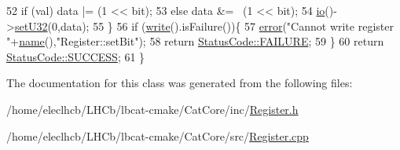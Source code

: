 \begin{DoxyCode}
52     \textcolor{keywordflow}{if} (val) data |= (1 << bit);
53     \textcolor{keywordflow}{else}     data &= ~(1 << bit);
54     \hyperlink{classIOobject_af04fb94137c3d86849f478ac5afab5d1}{io}()->\hyperlink{classIOdata_abbed9a057203bc763f97b85fb385f36b}{setU32}(0,data);
55   \}
56   \textcolor{keywordflow}{if} (\hyperlink{classIOobject_a9f6984bc9f0fadcf800f1be2523ac744}{write}().isFailure())\{
57     \hyperlink{classObject_a204a95f57818c0f811933917a30eff45}{error}(\textcolor{stringliteral}{"Cannot write register "}+\hyperlink{classObject_a300f4c05dd468c7bb8b3c968868443c1}{name}(),\textcolor{stringliteral}{"Register::setBit"});
58     \textcolor{keywordflow}{return} \hyperlink{classStatusCode_a6f565cbeadc76d14c72f047e5e85eb4ba3da73d4c469762eb9d3c960368252b26}{StatusCode::FAILURE};
59   \}
60   \textcolor{keywordflow}{return} \hyperlink{classStatusCode_a6f565cbeadc76d14c72f047e5e85eb4badd0da38d3ba0d922efd1f4619bc37ad8}{StatusCode::SUCCESS};
61 \}
\end{DoxyCode}


The documentation for this class was generated from the following files\+:\begin{DoxyCompactItemize}
\item 
/home/eleclhcb/\+L\+H\+Cb/lbcat-\/cmake/\+Cat\+Core/inc/\hyperlink{Register_8h}{Register.\+h}\item 
/home/eleclhcb/\+L\+H\+Cb/lbcat-\/cmake/\+Cat\+Core/src/\hyperlink{Register_8cpp}{Register.\+cpp}\end{DoxyCompactItemize}
